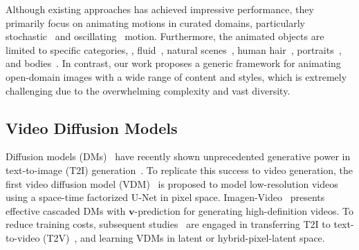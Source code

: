 Although existing approaches has achieved impressive performance, they primarily focus on animating motions in curated domains, particularly stochastic~\cite{endo2019animating,jhou2015animating,blattmann2021ipoke,xue2018visual,okabe2009animating,chuang2005animating,lee2018stochastic,dorkenwald2021stochastic} and oscillating~\cite{li2023generative} motion. Furthermore, the animated objects are limited to specific categories, \eg, fluid~\cite{holynski2021animating,okabe2009animating,holynski2021animating,mahapatra2022controllable}, natural scenes~\cite{xiong2018learning,li2023generative,cheng2020time,jhou2015animating,shaham2019singan}, human hair~\cite{xiao2023automatic}, portraits~\cite{wang2021latent,wang2020imaginator,geng2018warp}, and bodies~\cite{wang2021latent,weng2019photo,karras2023dreampose,siarohin2021motion,blattmann2021understanding,bertiche2023blowing}. In contrast, our work proposes a generic framework for animating open-domain images with a wide range of content and styles, which is extremely challenging due to the overwhelming complexity and vast diversity.


\vspace{-0.5mm}
\subsection{Video Diffusion Models}
\label{subsec:video_diffusion_models}
\vspace{-0.5mm}
Diffusion models (DMs)~\cite{sohl2015deep,ho2020denoising} have recently shown unprecedented generative power in text-to-image (T2I) generation~\cite{ramesh2022hierarchical,nichol2022glide,saharia2022photorealistic,rombach2022high,he2023scalecrafter,zhang2023real}. To replicate this success to video generation, the first video diffusion model (VDM)~\cite{ho2022video} is proposed to model low-resolution videos using a space-time factorized U-Net in pixel space. Imagen-Video~\cite{ho2022imagenvideo} presents effective cascaded DMs with $\mathbf{v}$-prediction for generating high-definition videos. To reduce training costs, subsequent studies~\cite{wang2023modelscope,he2022latent,blattmann2023align,zhou2022magicvideo,wang2023lavie} are engaged in transferring T2I to text-to-video (T2V)~\cite{singer2022make,luo2023videofusion,ge2023preserve,zhang2023show1}, and learning VDMs in latent or hybrid-pixel-latent space.

